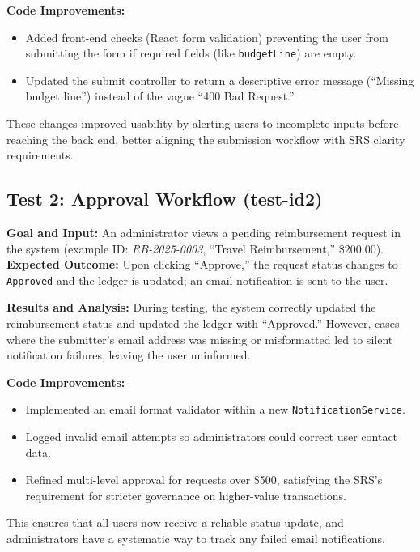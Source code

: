 \documentclass[12pt, titlepage]{article}
\begin{document}
\noindent
\textbf{Code Improvements:}
\begin{itemize}
  \item Added front-end checks (React form validation) preventing the user from submitting the form if required fields (like \texttt{budgetLine}) are empty.
  \item Updated the submit controller to return a descriptive error message (“Missing budget line”) instead of the vague “400 Bad Request.”
\end{itemize}
These changes improved usability by alerting users to incomplete inputs before reaching the back end, better aligning the submission workflow with SRS clarity requirements.


\subsection{Test 2: Approval Workflow (test-id2)}

\noindent
\textbf{Goal and Input:}  
An administrator views a pending reimbursement request in the system (example ID: \emph{RB-2025-0003}, “Travel Reimbursement,” \$200.00).  
\textbf{Expected Outcome:} Upon clicking “Approve,” the request status changes to \texttt{Approved} and the ledger is updated; an email notification is sent to the user.

\noindent
\textbf{Results and Analysis:}  
During testing, the system correctly updated the reimbursement status and updated the ledger with “Approved.” However, cases where the submitter’s email address was missing or misformatted led to silent notification failures, leaving the user uninformed.

\noindent
\textbf{Code Improvements:}
\begin{itemize}
  \item Implemented an email format validator within a new \texttt{NotificationService}.
  \item Logged invalid email attempts so administrators could correct user contact data.
  \item Refined multi-level approval for requests over \$500, satisfying the SRS’s requirement for stricter governance on higher-value transactions.
\end{itemize}
This ensures that all users now receive a reliable status update, and administrators have a systematic way to track any failed email notifications.
\end{document}
